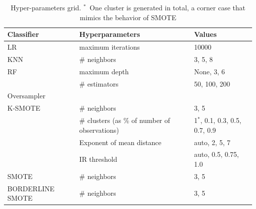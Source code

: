 \documentclass[remotesensing,article,submit,moreauthors,pdftex]{Definitions/mdpi}
\begin{document}
\begin{table}
	\centering
	\begin{tabular}{lll}
		\toprule
		Classifier       & Hyperparameters      & Values                            \\
		\midrule
		LR               & maximum iterations   & 10000                             \\
		KNN              & \# neighbors  & {3, 5, 8}                            \\
		RF               & maximum depth        & {None, 3, 6}                      \\
		                 & \# estimators & {50, 100, 200}                         \\
		\toprule
		Oversampler      &                      &                                   \\
		\midrule
		K-SMOTE          & \# neighbors  & {3, 5}                            \\
		                 & \# clusters (as \% of number of observations)   & {1$^*$, 0.1, 0.3, 0.5, 0.7, 0.9}      \\
                         & Exponent of mean distance & {auto, 2, 5, 7}       \\
                         & IR threshold  & {auto, 0.5, 0.75, 1.0}            \\
		SMOTE            & \# neighbors  & {3, 5}                            \\
		BORDERLINE SMOTE & \# neighbors  & {3, 5}                            \\
		\bottomrule
	\end{tabular}
    \caption{\label{tab:grid}Hyper-parameters grid. $^*$~One cluster is generated in total, a corner
        case that mimics the behavior of SMOTE}
\end{table}
\end{document}
